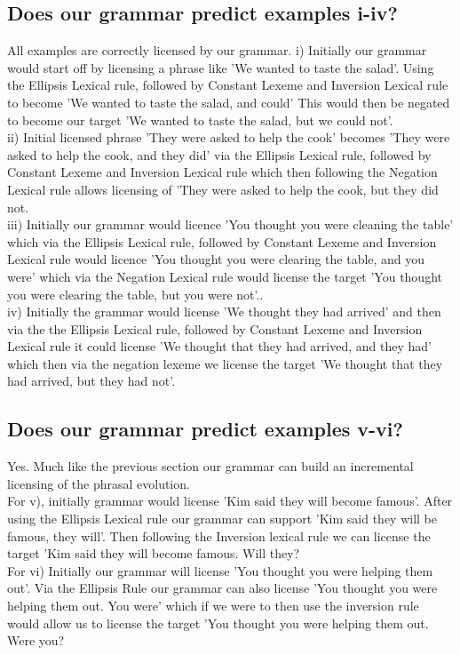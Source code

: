 \documentclass{article}
\begin{document}
\subsection{Does our grammar predict examples i-iv?}
All examples are correctly licensed by our grammar. i) Initially our grammar would start off by licensing a phrase like 'We wanted to taste the salad'. Using the Ellipsis Lexical rule, followed by Constant Lexeme and Inversion Lexical rule to become 'We wanted to taste the salad, and could' This would then be negated to become our target 'We wanted to taste the salad, but we could not'. \\
ii) Initial licensed phrase 'They were asked to help the cook' becomes 'They were asked to help the cook, and they did' via the Ellipsis Lexical rule, followed by Constant Lexeme and Inversion Lexical rule which then following the Negation Lexical rule allows licensing of 'They were asked to help the cook, but they did not. \\
iii) Initially our grammar would licence 'You thought you were cleaning the table' which via the Ellipsis Lexical rule, followed by Constant Lexeme and Inversion Lexical rule would licence 'You thought you were clearing the table, and you were' which via the Negation Lexical rule would license the target 'You thought you were clearing the table, but you were not'.. \\
iv) Initially the grammar would license 'We thought they had arrived' and then via the the Ellipsis Lexical rule, followed by Constant Lexeme and Inversion Lexical rule it could license 'We thought that they had arrived, and they had' which then via the negation lexeme we license the target 'We thought that they had arrived, but they had not'.
\subsection{Does our grammar predict examples v-vi?}
Yes. Much like the previous section our grammar can build an incremental licensing of the phrasal evolution. \\ For v), initially grammar would license 'Kim said they will become famous'. After using the Ellipsis Lexical rule our grammar can support 'Kim said they will be famous, they will'. Then following the Inversion lexical rule we can license the target 'Kim said they will become famous. Will they? \\ For vi) Initially our grammar will license 'You thought you were helping them out'. Via the Ellipsis Rule our grammar can also license 'You thought you were helping them out. You were' which if we were to then use the inversion rule would allow us to license the target 'You thought you were helping them out. Were you?
\end{document}
